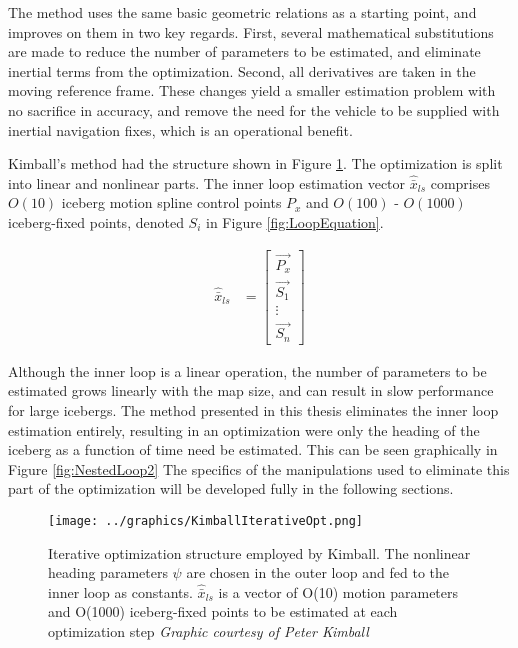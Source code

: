 The method uses the same basic geometric relations as a starting point, and improves on them in two key regards. First, several mathematical substitutions are made to reduce the number of parameters to be estimated, and eliminate inertial terms from the optimization. Second, all derivatives are taken in the moving reference frame. These changes yield a smaller estimation problem with no sacrifice in accuracy, and remove the need for the vehicle to be supplied with inertial navigation fixes, which is an operational benefit.

Kimball's method had the structure shown in Figure \ref{fig:NestedLoop}. The optimization is split into linear and nonlinear parts. The inner loop estimation vector $\hat{\bar{x}}_{ls}$ comprises $O(10)$ iceberg motion spline control points $P_x$ and $O(100)$ - $O(1000)$ iceberg-fixed points, denoted $S_i$ in Figure \ref{fig:LoopEquation}.

\begin{align}
\hat{\bar{x}}_{ls} &= 
        \left[\begin{array}{c}
        \vec{P_x}\\
        \vec{S_1}\\
        \vdots\\
        \vec{S_n}
        \end{array}
        \right]
\end{align}

Although the inner loop is a linear operation, the number of parameters to be estimated grows linearly with the map size, and can result in slow performance for large icebergs. The method presented in this thesis eliminates the inner loop estimation entirely, resulting in an optimization were only the heading of the iceberg as a function of time need be estimated. This can be seen graphically in Figure \ref{fig:NestedLoop2} The specifics of the manipulations used to eliminate this part of the optimization will be developed fully in the following sections. 

\begin{figure}[htbp]
   \centering
   \texttt{[image: ../graphics/KimballIterativeOpt.png]} %
   \caption{Iterative optimization structure employed by Kimball. The nonlinear heading parameters $\psi$ are chosen in the outer loop and fed to the inner loop as constants. $\hat{\bar{x}}_{ls}$ is a vector of O(10) motion parameters and O(1000) iceberg-fixed points to be estimated at each optimization step  \emph{Graphic courtesy of Peter Kimball}}
   \label{fig:NestedLoop}
\end{figure}

